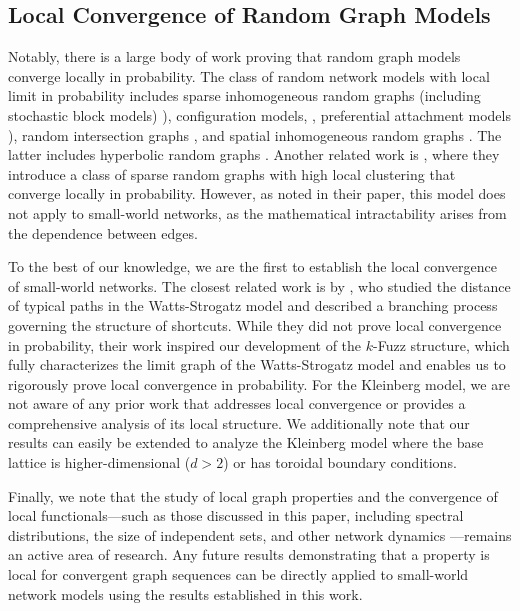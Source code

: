 \documentclass[10pt]{amsart}
\begin{document}
\subsection*{Local Convergence of Random Graph Models}
Notably, there is a large body of work proving that random graph models converge locally in probability. The class of random network models with local limit in probability includes sparse inhomogeneous random graphs (including stochastic block models) \cite[Chapter 3]{BolJanRio07, remco}),  configuration models, \cite[Chapter 4]{DemMon10b, remco}, 
preferential attachment models \cite[Chapter 5]{BerBorChaSab14, GarHazHofRay22, remco}), random intersection graphs \cite{Kura15, HofKomVad18}, and spatial inhomogeneous random graphs  \cite{van2021local}. The latter includes hyperbolic random graphs \cite{KomLod20, KriPapKitVahBog10}. 
Another related work is \cite{bollobas2011sparse}, where they introduce a class of sparse random graphs with high local clustering that converge locally in probability. However, as noted in their paper, this model does not apply to small-world networks, as the mathematical intractability arises from the dependence between edges.

To the best of our knowledge, we are the first to establish the local convergence of small-world networks.  The closest related work is by \cite{barbour2006discrete}, who studied the distance of typical paths in the Watts-Strogatz model and described a branching process governing the structure of shortcuts. While they did not prove local convergence in probability, their work inspired our development of the  $k$-Fuzz structure, which fully characterizes the limit graph of the Watts-Strogatz model and enables us to rigorously prove local convergence in probability. For the Kleinberg model, we are not aware of any prior work that addresses local convergence or provides a comprehensive analysis of its local structure. We additionally note that our results can easily be extended to analyze the Kleinberg model where the base lattice is higher-dimensional ($d >2$) or has toroidal boundary conditions.

Finally, we note that the study of local graph properties and the convergence of local functionals—such as those discussed in this paper, including spectral distributions, the size of independent sets, and other network dynamics \cite{gamarnik2006maximum, ganguly2022hydrodynamic, garavaglia2018local, lacker2019local}—remains an active area of research. Any future results demonstrating that a property is local for convergent graph sequences can be directly applied to small-world network models using the results established in this work.
\end{document}
